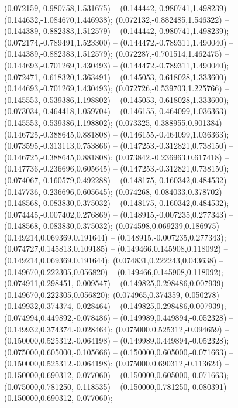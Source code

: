  (0.072159,-0.980758,1.531675) -- (0.144442,-0.980741,1.498239) -- (0.144632,-1.084670,1.446938);
 (0.072132,-0.882485,1.546322) -- (0.144389,-0.882383,1.512579) -- (0.144442,-0.980741,1.498239);
 (0.072174,-0.789491,1.523300) -- (0.144472,-0.789311,1.490040) -- (0.144389,-0.882383,1.512579);
 (0.072287,-0.701514,1.462475) -- (0.144693,-0.701269,1.430493) -- (0.144472,-0.789311,1.490040);
 (0.072471,-0.618320,1.363491) -- (0.145053,-0.618028,1.333600) -- (0.144693,-0.701269,1.430493);
 (0.072726,-0.539703,1.225766) -- (0.145553,-0.539386,1.198802) -- (0.145053,-0.618028,1.333600);
 (0.073034,-0.464418,1.059704) -- (0.146155,-0.464099,1.036363) -- (0.145553,-0.539386,1.198802);
 (0.073325,-0.388955,0.901384) -- (0.146725,-0.388645,0.881808) -- (0.146155,-0.464099,1.036363);
 (0.073595,-0.313113,0.753866) -- (0.147253,-0.312821,0.738150) -- (0.146725,-0.388645,0.881808);
 (0.073842,-0.236963,0.617418) -- (0.147736,-0.236696,0.605645) -- (0.147253,-0.312821,0.738150);
 (0.074067,-0.160579,0.492288) -- (0.148175,-0.160342,0.484532) -- (0.147736,-0.236696,0.605645);
 (0.074268,-0.084033,0.378702) -- (0.148568,-0.083830,0.375032) -- (0.148175,-0.160342,0.484532);
 (0.074445,-0.007402,0.276869) -- (0.148915,-0.007235,0.277343) -- (0.148568,-0.083830,0.375032);
 (0.074598,0.069239,0.186975) -- (0.149214,0.069369,0.191644) -- (0.148915,-0.007235,0.277343);
 (0.074727,0.145813,0.109185) -- (0.149466,0.145908,0.118092) -- (0.149214,0.069369,0.191644);
 (0.074831,0.222243,0.043638) -- (0.149670,0.222305,0.056820) -- (0.149466,0.145908,0.118092);
 (0.074911,0.298451,-0.009547) -- (0.149825,0.298486,0.007939) -- (0.149670,0.222305,0.056820);
 (0.074965,0.374359,-0.050278) -- (0.149932,0.374374,-0.028464) -- (0.149825,0.298486,0.007939);
 (0.074994,0.449892,-0.078486) -- (0.149989,0.449894,-0.052328) -- (0.149932,0.374374,-0.028464);
 (0.075000,0.525312,-0.094659) -- (0.150000,0.525312,-0.064198) -- (0.149989,0.449894,-0.052328);
 (0.075000,0.605000,-0.105666) -- (0.150000,0.605000,-0.071663) -- (0.150000,0.525312,-0.064198);
 (0.075000,0.690312,-0.113624) -- (0.150000,0.690312,-0.077060) -- (0.150000,0.605000,-0.071663);
 (0.075000,0.781250,-0.118535) -- (0.150000,0.781250,-0.080391) -- (0.150000,0.690312,-0.077060);
